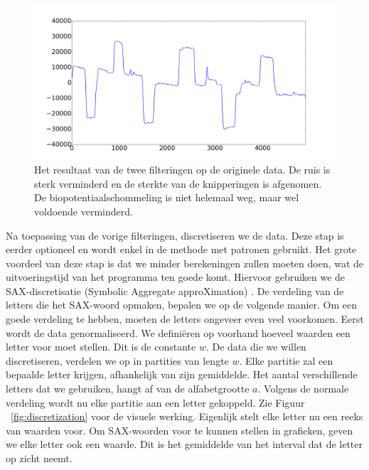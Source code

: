 \documentclass{article}
\begin{document}
\begin{figure}[h]
\centering
\includegraphics[width=\linewidth]{images/filtered_data}
\caption{Het resultaat van de twee filteringen op de originele data. De ruis is sterk verminderd en de sterkte van de knipperingen is afgenomen. De biopotentiaalschommeling is niet helemaal weg, maar wel voldoende verminderd.}
\label{fig:filtereddata}
\end{figure}

Na toepassing van de vorige filteringen, discretiseren we de data. Deze stap is eerder optioneel en wordt enkel in de methode met patronen gebruikt. Het grote voordeel van deze stap is dat we minder berekeningen zullen moeten doen, wat de uitvoeringstijd van het programma ten goede komt. Hiervoor gebruiken we de SAX-discretisatie (Symbolic Aggregate approXimation) \cite{sax}. De verdeling van de letters die het SAX-woord opmaken, bepalen we op de volgende manier. Om een goede verdeling te hebben, moeten de letters ongeveer even veel voorkomen. Eerst wordt de data genormaliseerd. We definiëren op voorhand hoeveel waarden een letter voor moet stellen. Dit is de constante $w$. De data die we willen discretiseren, verdelen we op in partities van lengte $w$. Elke partitie zal een bepaalde letter krijgen, afhankelijk van zijn gemiddelde. Het aantal verschillende letters dat we gebruiken, hangt af van de alfabetgrootte $a$. Volgens de normale verdeling wordt nu elke partitie aan een letter gekoppeld. Zie Figuur ~\ref{fig:discretization} voor de visuele werking. Eigenlijk stelt elke letter nu een reeks van waarden voor. Om SAX-woorden voor te kunnen stellen in grafieken, geven we elke letter ook een waarde. Dit is het gemiddelde van het interval dat de letter op zicht neemt.
\end{document}
